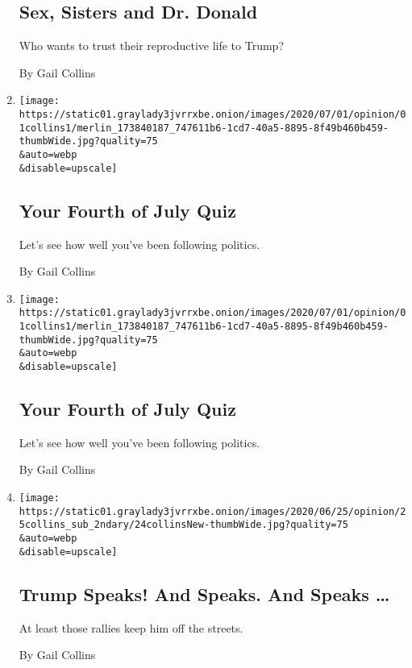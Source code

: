\begin{enumerate}
  \hypertarget{sex-sisters-and-dr-donald}{%
  \subsection{Sex, Sisters and Dr.
  Donald}\label{sex-sisters-and-dr-donald}}

  Who wants to trust their reproductive life to Trump?

  By Gail Collins
\item
  \href{/interactive/2020/07/01/opinion/4th-of-july-quiz.html}{}

  \texttt{[image: https://static01.graylady3jvrrxbe.onion/images/2020/07/01/opinion/01collins1/merlin\_173840187\_747611b6-1cd7-40a5-8895-8f49b460b459-thumbWide.jpg?quality=75\\\&auto=webp\\\&disable=upscale]}

  \hypertarget{your-fourth-of-july-quiz}{%
  \subsection{Your Fourth of July Quiz}\label{your-fourth-of-july-quiz}}

  Let's see how well you've been following politics.

  By Gail Collins
\item
  \href{/interactive/2020/07/01/opinion/4th-of-july-quiz.html}{}

  \texttt{[image: https://static01.graylady3jvrrxbe.onion/images/2020/07/01/opinion/01collins1/merlin\_173840187\_747611b6-1cd7-40a5-8895-8f49b460b459-thumbWide.jpg?quality=75\\\&auto=webp\\\&disable=upscale]}

  \hypertarget{your-fourth-of-july-quiz-1}{%
  \subsection{Your Fourth of July
  Quiz}\label{your-fourth-of-july-quiz-1}}

  Let's see how well you've been following politics.

  By Gail Collins
\item
  \href{/2020/06/24/opinion/trump-tulsa-2020.html}{}

  \texttt{[image: https://static01.graylady3jvrrxbe.onion/images/2020/06/25/opinion/25collins\_sub\_2ndary/24collinsNew-thumbWide.jpg?quality=75\\\&auto=webp\\\&disable=upscale]}

  \hypertarget{trump-speaks-and-speaks-and-speaks-}{%
  \subsection{Trump Speaks! And Speaks. And Speaks
  \ldots{}}\label{trump-speaks-and-speaks-and-speaks-}}

  At least those rallies keep him off the streets.

  By Gail Collins
\end{enumerate}

